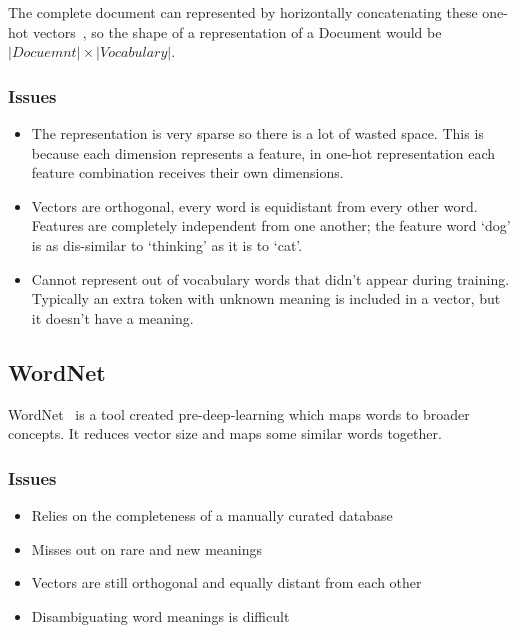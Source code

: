 \documentclass[11pt]{article}
\begin{document}
The complete document can represented by horizontally concatenating these one-hot vectors~\cite{git-natural-language-processing}, so the shape of a representation of a Document would be $|Docuemnt| \times |Vocabulary|$.

\subsubsection{Issues}

\begin{itemize}
    \item The representation is very sparse so there is a lot of wasted space. This is because each dimension represents a feature, in one-hot representation each feature combination receives their own dimensions.

    \item Vectors are orthogonal, every word is equidistant from every other word. Features are completely independent from one another; the feature word `dog' is as dis-similar to `thinking' as it is to `cat'.
    
    \item Cannot represent out of vocabulary words that didn't appear during training. Typically an extra token with unknown meaning is included in a vector, but it doesn't have a meaning.
\end{itemize}

\subsection{WordNet}

WordNet~\cite{wordnet-how-to} is a tool created pre-deep-learning which maps words to broader concepts. It reduces vector size and maps some similar words together.

\subsubsection{Issues}

\begin{itemize}
    \item Relies on the completeness of a manually curated database
    \item Misses out on rare and new meanings
    \item Vectors are still orthogonal and equally distant from each other
    \item Disambiguating word meanings is difficult
\end{itemize}
\end{document}
